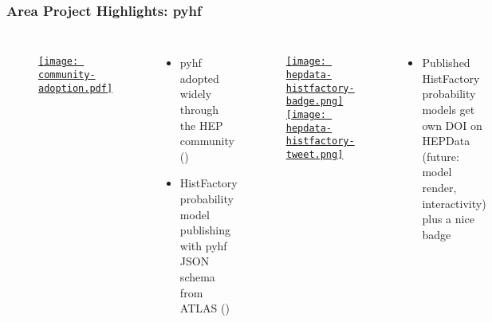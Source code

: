 \begin{frame}
  \frametitle{Area Project Highlights: pyhf}

  \begin{columns}
    \begin{figure}
        \begin{center}
            \href{https://scikit-hep.org/pyhf/citations.html}{\texttt{[image: community-adoption.pdf]}}
        \end{center}
    \end{figure}
    \begin{itemize}
      \item pyhf adopted widely through the HEP community ()
      \item HistFactory probability model publishing with pyhf JSON schema from ATLAS ()
    \end{itemize}
%
    \begin{figure}
        \begin{center}
            \href{https://www.hepdata.net/search/?q=analysis:HistFactory}{\texttt{[image: hepdata-histfactory-badge.png]}}
            \href{https://twitter.com/HEPData/status/1529038702344798212}{\texttt{[image: hepdata-histfactory-tweet.png]}}
        \end{center}
    \end{figure}
    \vspace{-10pt}
    \begin{itemize}
      \item Published HistFactory probability models get own DOI on HEPData (future: model render, interactivity) plus a nice badge
    \end{itemize}
  \end{columns}

\end{frame}

